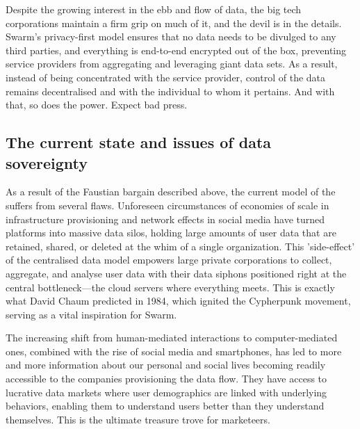 Despite the growing interest in the ebb and flow of data, the big tech corporations maintain a firm grip on much of it, and the devil is in the details. Swarm's privacy-first model ensures that no data needs to be divulged to any third parties, and everything is end-to-end encrypted out of the box, preventing service providers from aggregating and leveraging giant data sets. As a result, instead of being concentrated with the service provider, control of the data remains decentralised and with the individual to whom it pertains. And with that, so does the power. Expect bad press.

\subsection{The current state and issues of data sovereignty \statusgreen }\label{sec:data-sovereignty}

As a result of the Faustian bargain described above, the current model of the  suffers from several flaws. Unforeseen circumstances of economies of scale in infrastructure provisioning and network effects in social media have turned platforms into massive data silos, holding large amounts of user data that are retained, shared, or deleted at the whim of a single organization. This 'side-effect' of the centralised data model empowers large private corporations to collect, aggregate, and analyse user data with their data siphons positioned right at the central bottleneck—the cloud servers where everything meets. This is exactly what David Chaum predicted in 1984, which ignited the Cypherpunk movement, serving as a vital inspiration for Swarm.

The increasing shift from human-mediated interactions to computer-mediated ones, combined with the rise of social media and smartphones, has led to more and more information about our personal and social lives becoming readily accessible to the companies provisioning the data flow. They have access to lucrative data markets where user demographics are linked with underlying behaviors, enabling them to understand users better than they understand themselves. This is the ultimate treasure trove for marketeers.

